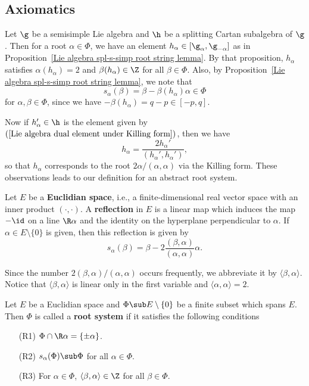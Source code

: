\subsection{Axiomatics}
Let $\g$ be a semisimple Lie algebra and $\h$ be a splitting Cartan subalgebra of $\g$. Then for a root $\alpha\in\Phi$, we have an element $h_\alpha\in[\g_\alpha,\g_{-\alpha}]$ as in Proposition~\ref{Lie algebra spl-s-simp root string lemma}. By that proposition, $h_\alpha$ satisfies $\alpha(h_\alpha)=2$ and $\beta(h_\alpha)\in\Z$ for all $\beta\in\Phi$. Also, by Proposition~\ref{Lie algebra spl-s-simp root string lemma}, we note that
\[s_\alpha(\beta)=\beta-\beta(h_\alpha)\alpha\in\Phi\]
for $\alpha,\beta\in\Phi$, since we have $-\beta(h_\alpha)=q-p\in[-p,q]$.\par
Now if $h_\alpha'\in\h$ is the element given by $(\ref{Lie algebra dual element under Killing form})$, then we have
\[h_\alpha=\frac{2h_\alpha'}{(h_\alpha',h_\alpha')},\]
so that $h_\alpha$ corresponds to the root $2\alpha/(\alpha,\alpha)$ via the Killing form. These observations leads to our definition for an abstract root system.
\begin{definition}
Let $E$ be a \textbf{Euclidian space}, i.e., a finite-dimensional real vector space with an inner product $(\cdot,\cdot)$. A \textbf{reflection} in $E$ is a linear map which induces the map $-\id$ on a line $\R\alpha$ and the identity on the hyperplane perpendicular to $\alpha$. If $\alpha\in E\setminus\{0\}$ is given, then this reflection is given by
\[s_\alpha(\beta)=\beta-2\frac{(\beta,\alpha)}{(\alpha,\alpha)}\alpha.\]
\end{definition}
Since the number $2(\beta,\alpha)/(\alpha,\alpha)$ occurs frequently, we abbreviate it by $\langle\beta,\alpha\rangle$. Notice that $\langle\beta,\alpha\rangle$ is linear only in the first variable and $\langle\alpha,\alpha\rangle=2$.
\begin{definition}
Let $E$ be a Euclidian space and $\Phi\sub E\setminus\{0\}$ be a finite subset which spans $E$. Then $\Phi$ is called a \textbf{root system} if it satisfies the following conditions
\begin{itemize}
\item[(R1)] $\Phi\cap\R\alpha=\{\pm\alpha\}$.
\item[(R2)] $s_\alpha(\Phi)\sub\Phi$ for all $\alpha\in\Phi$.
\item[(R3)] For $\alpha\in\Phi$, $\langle\beta,\alpha\rangle\in\Z$ for all $\beta\in\Phi$.
\end{itemize}
\end{definition}
